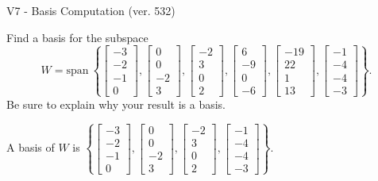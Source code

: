 \begin{exercise}
  \begin{exerciseTitle}V7 - Basis Computation (ver. 532)\end{exerciseTitle}
  \begin{exerciseStatement}
    Find a basis for the subspace 
\[W=\mathrm{span}\ \left\{\left[\begin{array}{r}
-3 \\
-2 \\
-1 \\
0
\end{array}\right] , \left[\begin{array}{r}
0 \\
0 \\
-2 \\
3
\end{array}\right] , \left[\begin{array}{r}
-2 \\
3 \\
0 \\
2
\end{array}\right] , \left[\begin{array}{r}
6 \\
-9 \\
0 \\
-6
\end{array}\right] , \left[\begin{array}{r}
-19 \\
22 \\
1 \\
13
\end{array}\right] , \left[\begin{array}{r}
-1 \\
-4 \\
-4 \\
-3
\end{array}\right]\right\}.\]
 Be sure to explain why your result is a basis.


  \end{exerciseStatement}
  \begin{exerciseAnswer}
   A basis of \(W\) is  \(\left\{\left[\begin{array}{r}
-3 \\
-2 \\
-1 \\
0
\end{array}\right] , \left[\begin{array}{r}
0 \\
0 \\
-2 \\
3
\end{array}\right] , \left[\begin{array}{r}
-2 \\
3 \\
0 \\
2
\end{array}\right] , \left[\begin{array}{r}
-1 \\
-4 \\
-4 \\
-3
\end{array}\right]\right\}\).
  


  \end{exerciseAnswer}
\end{exercise}